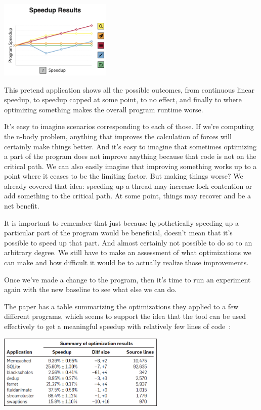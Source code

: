 \documentclass[a4paper]{report}
\begin{document}
\begin{center}
	\includegraphics[width=0.4\textwidth]{images/coz-speedup-graph.png}
\end{center}

This pretend application shows all the possible outcomes, from continuous linear speedup, to speedup capped at some point, to no effect, and finally to where optimizing something makes the overall program runtime worse. 

It's easy to imagine scenarios corresponding to each of those. If we're computing the n-body problem, anything that improves the calculation of forces will certainly make things better. And it's easy to imagine that sometimes optimizing a part of the program does not improve anything because that code is not on the critical path. We can also easily imagine that improving something works up to a point where it ceases to be the limiting factor. But making things worse? We already covered that idea: speeding up a thread may increase lock contention or add something to the critical path. At some point, things may recover and be a net benefit.

It is important to remember that just because hypothetically speeding up a particular part of the program would be beneficial, doesn't mean that it's possible to speed up that part. And almost certainly not possible to do so to an arbitrary degree. We still have to make an assessment of what optimizations we can make and how difficult it would be to actually realize those improvements.

Once we've made a change to the program, then it's time to run an experiment again with the new baseline to see what else we can do.

The paper has a table summarizing the optimizations they applied to a few different programs, which seems to support the idea that the tool can be used effectively to get a meaningful speedup with relatively few lines of code~\cite{coz}:
\begin{center}
	\includegraphics[width=0.6\textwidth]{images/coz-speedup.jpg}
\end{center}
\end{document}
